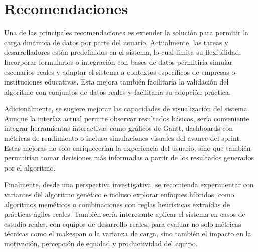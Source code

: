 \section{Recomendaciones}

Una de las principales recomendaciones es extender la solución para permitir la carga dinámica de datos por parte del usuario. Actualmente, las tareas y desarrolladores están predefinidos en el sistema, lo cual limita su flexibilidad. Incorporar formularios o integración con bases de datos permitiría simular escenarios reales y adaptar el sistema a contextos específicos de empresas o instituciones educativas. Esta mejora también facilitaría la validación del algoritmo con conjuntos de datos reales y facilitaría su adopción práctica.

Adicionalmente, se sugiere mejorar las capacidades de visualización del sistema. Aunque la interfaz actual permite observar resultados básicos, sería conveniente integrar herramientas interactivas como gráficos de Gantt, dashboards con métricas de rendimiento o incluso simulaciones visuales del avance del sprint. Estas mejoras no solo enriquecerían la experiencia del usuario, sino que también permitirían tomar decisiones más informadas a partir de los resultados generados por el algoritmo.

Finalmente, desde una perspectiva investigativa, se recomienda experimentar con variantes del algoritmo genético e incluso explorar enfoques híbridos, como algoritmos meméticos o combinaciones con reglas heurísticas extraídas de prácticas ágiles reales. También sería interesante aplicar el sistema en casos de estudio reales, con equipos de desarrollo reales, para evaluar no solo métricas técnicas como el makespan o la varianza de carga, sino también el impacto en la motivación, percepción de equidad y productividad del equipo.




